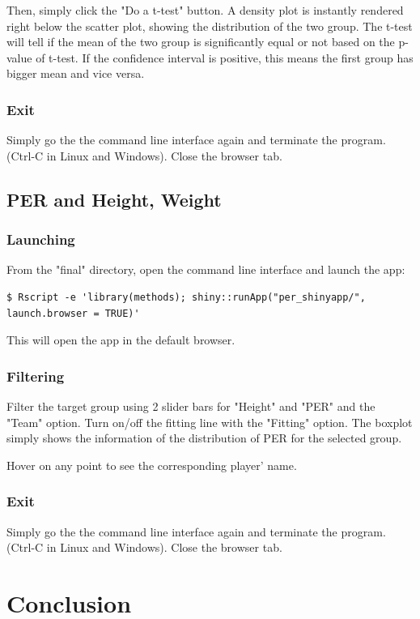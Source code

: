 \documentclass[a4paper,12pt,twoside]{article}
\numberwithin{equation}{section}
\begin{document}
Then, simply click the "Do a t-test" button. A density plot is instantly rendered right below the scatter plot, showing the distribution of the two group. The t-test will tell if the mean of the two group is significantly equal or not based on the p-value of t-test. If the confidence interval is positive, this means the first group has bigger mean and vice versa.
\subsubsection{Exit}
Simply go the the command line interface again and terminate the program. (Ctrl-C in Linux and Windows). Close the browser tab.

\subsection{PER and Height, Weight}
\subsubsection{Launching}
From the "final" directory, open the command line interface and launch the app:
\begin{lstlisting}
$ Rscript -e 'library(methods); shiny::runApp("per_shinyapp/", launch.browser = TRUE)'
\end{lstlisting}
This will open the app in the default browser.
\subsubsection{Filtering}
Filter the target group using 2 slider bars for "Height" and "PER" and the "Team" option. Turn on/off the fitting line with the "Fitting" option. The boxplot simply shows the information of the distribution of PER for the selected group.

Hover on any point to see the corresponding player' name.


\subsubsection{Exit}
Simply go the the command line interface again and terminate the program. (Ctrl-C in Linux and Windows). Close the browser tab.

\section{Conclusion}
\end{document}
